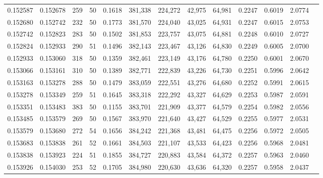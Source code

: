 \begin{tabular}{rrrrrrrrrrrrr}
0.152587 & 0.152678 &   259 &  50 &                                     0.1618 & 381,338 & 224,272 &  42,975 &  64,981 & 0.2247 & 0.6019 & 2.0774 \\
0.152680 & 0.152742 &   232 &  50 &                                     0.1773 & 381,570 & 224,040 &  43,025 &  64,931 & 0.2247 & 0.6015 & 2.0753 \\
0.152742 & 0.152823 &   283 &  50 &                                     0.1502 & 381,853 & 223,757 &  43,075 &  64,881 & 0.2248 & 0.6010 & 2.0727 \\
0.152824 & 0.152933 &   290 &  51 &                                     0.1496 & 382,143 & 223,467 &  43,126 &  64,830 & 0.2249 & 0.6005 & 2.0700 \\
0.152933 & 0.153060 &   318 &  50 &                                     0.1359 & 382,461 & 223,149 &  43,176 &  64,780 & 0.2250 & 0.6001 & 2.0670 \\
0.153066 & 0.153161 &   310 &  50 &                                     0.1389 & 382,771 & 222,839 &  43,226 &  64,730 & 0.2251 & 0.5996 & 2.0642 \\
0.153163 & 0.153278 &   288 &  50 &                                     0.1479 & 383,059 & 222,551 &  43,276 &  64,680 & 0.2252 & 0.5991 & 2.0615 \\
0.153278 & 0.153349 &   259 &  51 &                                     0.1645 & 383,318 & 222,292 &  43,327 &  64,629 & 0.2253 & 0.5987 & 2.0591 \\
0.153351 & 0.153483 &   383 &  50 &                                     0.1155 & 383,701 & 221,909 &  43,377 &  64,579 & 0.2254 & 0.5982 & 2.0556 \\
0.153485 & 0.153579 &   269 &  50 &                                     0.1567 & 383,970 & 221,640 &  43,427 &  64,529 & 0.2255 & 0.5977 & 2.0531 \\
0.153579 & 0.153680 &   272 &  54 &                                     0.1656 & 384,242 & 221,368 &  43,481 &  64,475 & 0.2256 & 0.5972 & 2.0505 \\
0.153683 & 0.153838 &   261 &  52 &                                     0.1661 & 384,503 & 221,107 &  43,533 &  64,423 & 0.2256 & 0.5968 & 2.0481 \\
0.153838 & 0.153923 &   224 &  51 &                                     0.1855 & 384,727 & 220,883 &  43,584 &  64,372 & 0.2257 & 0.5963 & 2.0460 \\
0.153926 & 0.154030 &   253 &  52 &                                     0.1705 & 384,980 & 220,630 &  43,636 &  64,320 & 0.2257 & 0.5958 & 2.0437 \\

\end{tabular}
